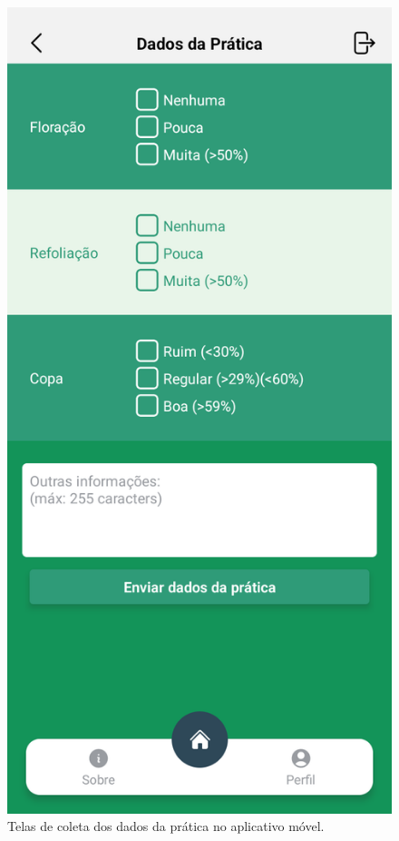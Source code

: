 \begin{figure}[H]
\begin{minipage}[b]{0.30\textwidth}
    \end{minipage}
    \hspace{5pt}
    \begin{minipage}[b]{0.30\textwidth}
        \centering
        \includegraphics[width=\textwidth]{images/app/07-practice-data.png}
    \end{minipage}
    \hspace{5pt}
    
    \caption{Telas de coleta dos dados da prática no aplicativo móvel.}
    \label{fig:PracticeDataScreen}
\end{figure}

